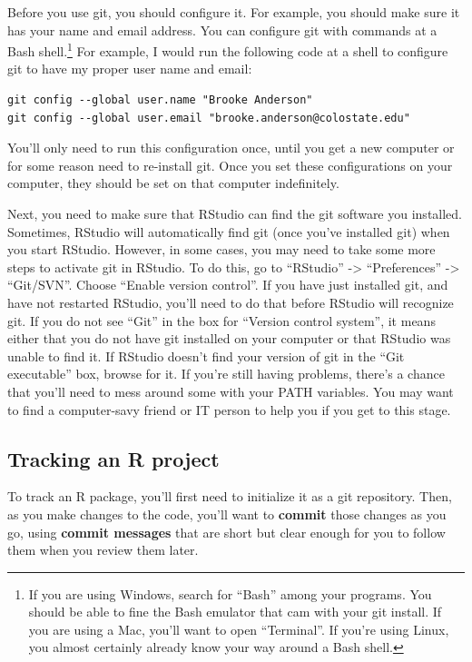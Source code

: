 \documentclass[]{tufte-book}
\begin{document}
Before you use git, you should configure it. For example, you should make sure
it has your name and email address. You can configure git with commands at a
Bash shell.\footnote{If you are using Windows, search for ``Bash'' among your programs.
  You should be able to fine the Bash emulator that cam with your git install. If
  you are using a Mac, you'll want to open ``Terminal''. If you're using Linux, you
  almost certainly already know your way around a Bash shell.} For example, I
would run the following code at a shell to configure git to have my proper user
name and email:

\begin{verbatim}
git config --global user.name "Brooke Anderson"
git config --global user.email "brooke.anderson@colostate.edu"
\end{verbatim}

You'll only need to run this configuration once, until you get a new computer or
for some reason need to re-install git. Once you set these configurations on
your computer, they should be set on that computer indefinitely.

Next, you need to make sure that RStudio can find the git software you
installed. Sometimes, RStudio will automatically find git (once you've installed
git) when you start RStudio. However, in some cases, you may need to take some
more steps to activate git in RStudio. To do this, go to ``RStudio'' -\textgreater{}
``Preferences'' -\textgreater{} ``Git/SVN''. Choose ``Enable version control''. If you have just
installed git, and have not restarted RStudio, you'll need to do that before
RStudio will recognize git. If you do not see ``Git'' in the box for ``Version
control system'', it means either that you do not have git installed on your
computer or that RStudio was unable to find it. If RStudio doesn't find your
version of git in the ``Git executable'' box, browse for it. If you're still
having problems, there's a chance that you'll need to mess around some with your
PATH variables. You may want to find a computer-savy friend or IT person to help
you if you get to this stage.

\hypertarget{tracking-an-r-project}{%
\subsection{Tracking an R project}\label{tracking-an-r-project}}

To track an R package, you'll first need to initialize it as a git repository.
Then, as you make changes to the code, you'll want to \textbf{commit} those changes
as you go, using \textbf{commit messages} that are short but clear enough for you to
follow them when you review them later.
\end{document}
